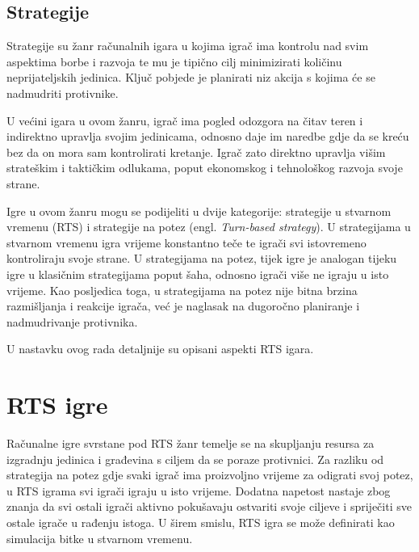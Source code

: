 \documentclass[times, utf8, zavrsni, numeric]{fer}
\begin{document}
\section{Strategije}

\par Strategije su žanr računalnih igara u kojima igrač ima kontrolu nad svim aspektima borbe i razvoja te mu je tipično cilj minimizirati količinu neprijateljskih jedinica.
Ključ pobjede je planirati niz akcija s kojima će se nadmudriti protivnike.

\par U većini igara u ovom žanru, igrač ima pogled odozgora na čitav teren i indirektno upravlja svojim jedinicama, odnosno daje im naredbe gdje da se kreću bez da on mora sam kontrolirati kretanje.
Igrač zato direktno upravlja višim strateškim i taktičkim odlukama, poput ekonomskog i tehnološkog razvoja svoje strane.

\par Igre u ovom žanru mogu se podijeliti u dvije kategorije: strategije u stvarnom vremenu (RTS) i strategije na potez (engl. \textit{Turn-based strategy}).
U strategijama u stvarnom vremenu igra vrijeme konstantno teče te igrači svi istovremeno kontroliraju svoje strane.
U strategijama na potez, tijek igre je analogan tijeku igre u klasičnim strategijama poput šaha, odnosno igrači više ne igraju u isto vrijeme.
Kao posljedica toga, u strategijama na potez nije bitna brzina razmišljanja i reakcije igrača, već je naglasak na dugoročno planiranje i nadmudrivanje protivnika.

\par U nastavku ovog rada detaljnije su opisani aspekti RTS igara.

\chapter{RTS igre}\label{ch:rtsGames}

\par Računalne igre svrstane pod RTS žanr temelje se na skupljanju resursa za izgradnju jedinica i građevina s ciljem da se poraze protivnici. 
Za razliku od strategija na potez gdje svaki igrač ima proizvoljno vrijeme za odigrati svoj potez, u RTS igrama svi igrači igraju u isto vrijeme.
Dodatna napetost nastaje zbog znanja da svi ostali igrači aktivno pokušavaju ostvariti svoje ciljeve i spriječiti sve ostale igrače u rađenju istoga.
U širem smislu, RTS igra se može definirati kao simulacija bitke u stvarnom vremenu.
\end{document}
